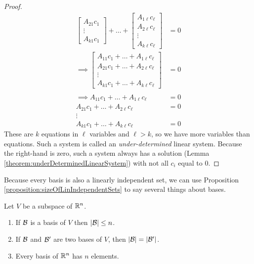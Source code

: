 \begin{proof}
\begin{align*}
\begin{bmatrix}
      A_{21}c_1 \\
      \vdots \\
      A_{k1}c_1
    \end{bmatrix}
    +
    \dots
    +
    \begin{bmatrix}
       A_{1\ell} c_\ell\\
       A_{2\ell} c_\ell\\
      \vdots \\
       A_{k\ell}c_\ell
    \end{bmatrix}
    &= 0 \\
    \implies
    \begin{bmatrix}
      A_{11} c_1 + \dots + A_{1\ell} c_\ell\\
      A_{21} c_1 + \dots + A_{2\ell} c_\ell\\
      \vdots \\
      A_{k1} c_1 + \dots + A_{k\ell}c_\ell
    \end{bmatrix}
    &= 0 \\\\
    \implies
      A_{11} c_1 + \dots + A_{1\ell} c_\ell &= 0 \\
      A_{21} c_1 + \dots + A_{2\ell} c_\ell &= 0 \\
      \vdots \\
      A_{k1} c_1 + \dots +  A_{k\ell}c_\ell &= 0
  \end{align*}
  These are $k$ equations in $\ell$ variables and $\ell > k$, so we have more variables than equations. Such a system is called an \emph{under-determined} linear system. Because the right-hand is zero, such a system always has a solution (Lemma \ref{theorem:underDeterminedLinearSystem}) with not all $c_i$ equal to 0.
\end{proof}

Because every basis is also a linearly independent set, we can use Proposition \ref{proposition:sizeOfLinIndependentSets} to say several things about bases.

\begin{corollary}
  Let $V$ be a subspace of $\mathbb{R}^n$.
  \begin{enumerate}
    \item If $\mathcal{B}$ is a basis of $V$ then $|\mathcal{B}| \le n$.
    \item If $\mathcal{B}$ and $\mathcal{B}'$ are two bases of $V$, then $|\mathcal{B}| = |\mathcal{B}'|$.
    \item Every basis of $\mathbb{R}^n$ has $n$ elements.
  \end{enumerate}
\end{corollary}

